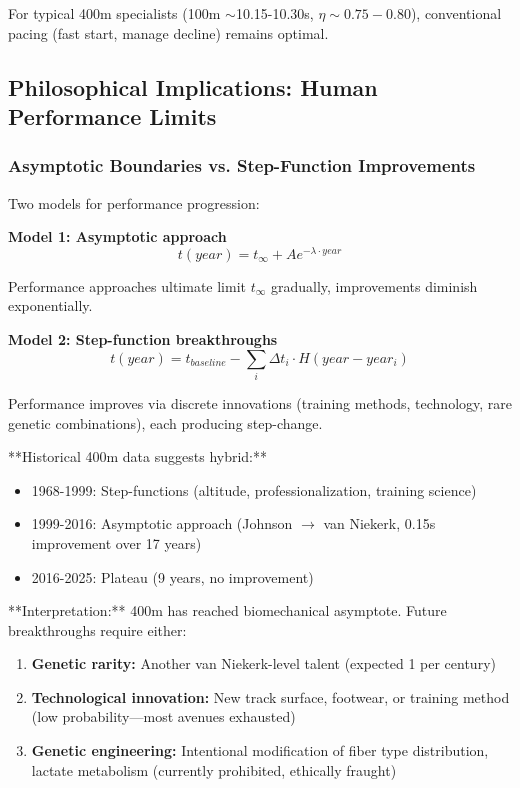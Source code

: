 For typical 400m specialists (100m $\sim$10.15-10.30s, $\eta \sim 0.75-0.80$), conventional pacing (fast start, manage decline) remains optimal.

\subsection{Philosophical Implications: Human Performance Limits}

\subsubsection{Asymptotic Boundaries vs. Step-Function Improvements}

Two models for performance progression:

\textbf{Model 1: Asymptotic approach}
\begin{equation}
t(year) = t_{\infty} + A e^{-\lambda \cdot year}
\end{equation}

Performance approaches ultimate limit $t_{\infty}$ gradually, improvements diminish exponentially.

\textbf{Model 2: Step-function breakthroughs}
\begin{equation}
t(year) = t_{baseline} - \sum_{i} \Delta t_i \cdot H(year - year_i)
\end{equation}

Performance improves via discrete innovations (training methods, technology, rare genetic combinations), each producing step-change.

**Historical 400m data suggests hybrid:**
\begin{itemize}
    \item 1968-1999: Step-functions (altitude, professionalization, training science)
    \item 1999-2016: Asymptotic approach (Johnson $\rightarrow$ van Niekerk, 0.15s improvement over 17 years)
    \item 2016-2025: Plateau (9 years, no improvement)
\end{itemize}

**Interpretation:** 400m has reached biomechanical asymptote. Future breakthroughs require either:
\begin{enumerate}
    \item \textbf{Genetic rarity:} Another van Niekerk-level talent (expected 1 per century)
    \item \textbf{Technological innovation:} New track surface, footwear, or training method (low probability—most avenues exhausted)
    \item \textbf{Genetic engineering:} Intentional modification of fiber type distribution, lactate metabolism (currently prohibited, ethically fraught)
\end{enumerate}

